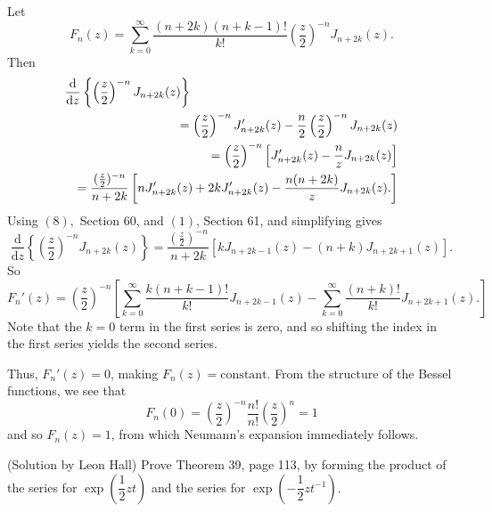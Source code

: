 \begin{solution}
Let 
$$F_n(z) = \displaystyle\sum_{k=0}^{\infty} \dfrac{(n+2k)(n+k-1)!}{k!} \left( \dfrac{z}{2} \right)^{-n} J_{n+2k}(z).$$
Then
\begin{eqnarray*}
\lefteqn{\dfrac{\mathrm{d}}{\mathrm{d}z} \left\{ \left( \dfrac{z}{2} \right)^{-n} J_{n+2k}(z) \right\}} \\
& &= \left( \dfrac{z}{2} \right)^{-n} J_{n+2k}'(z) - \dfrac{n}{2} \left( \dfrac{z}{2} \right)^{-n} J_{n+2k}(z) \\
& &= \left( \dfrac{z}{2} \right)^{-n} \left[ J_{n+2k}'(z) - \dfrac{n}{z} J_{n+2k}(z) \right] \\
& &= \dfrac{(\frac{z}{2})^{-n}}{n+2k} \left[ nJ_{n+2k}'(z) + 2kJ_{n+2k}'(z)-\dfrac{n(n+2k)}{z} J_{n+2k}(z). \right]
\end{eqnarray*}
Using $(8),$ Section 60, and $(1)$, Section 61, and simplifying gives
$$\dfrac{\mathrm{d}}{\mathrm{d}z} \left\{ \left( \dfrac{z}{2} \right)^{-n} J_{n+2k}(z) \right\} = \dfrac{(\frac{z}{2})^{-n}}{n+2k} \left[ kJ_{n+2k-1}(z) - (n+k) J_{n+2k+1}(z) \right].$$
So 
$$F_n'(z) = \left( \dfrac{z}{2} \right)^{-n} \left[ \displaystyle\sum_{k=0}^{\infty} \dfrac{k(n+k-1)!}{k!} J_{n+2k-1}(z) - \displaystyle\sum_{k=0}^{\infty} \dfrac{(n+k)!}{k!} J_{n+2k+1}(z). \right]$$
Note that the $k=0$ term in the first series is zero, and so shifting the index in the first series yields the second series. 

Thus, $F_n'(z)=0$, making $F_n(z)=\mathrm{constant}$. From the structure of the Bessel functions, we see that
$$F_n(0)=\left( \dfrac{z}{2} \right)^{-n} \dfrac{n!}{n!} \left( \dfrac{z}{2} \right)^n = 1$$
and so $F_n(z)=1$, from which Neumann's expansion immediately follows.
\end{solution}
\begin{problem} \label{problem23chapter6}(Solution by Leon Hall)
Prove Theorem 39, page 113, by forming the product of the series for $\exp \left( \dfrac{1}{2} zt \right)$ and the series for $\exp \left( - \dfrac{1}{2}zt^{-1} \right).$
\end{problem}
